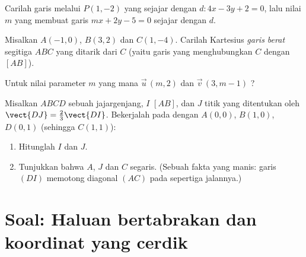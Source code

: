 \begin{exercise}[$\star\star$]\label{exo:g11:vect:8}
Carilah  garis melalui $P(1, -2)$ yang sejajar dengan
$d: 4x - 3y + 2 = 0$, lalu nilai $m$ yang membuat garis
$mx + 2y - 5 = 0$ sejajar dengan $d$.
\end{exercise}

\begin{exercise}[$\star\star$]\label{exo:g11:vect:9}
Misalkan $A(-1, 0)$, $B(3, 2)$ dan $C(1, -4)$. Carilah  Kartesius
\emph{garis berat} segitiga $ABC$ yang ditarik dari $C$ (yaitu garis yang
menghubungkan $C$ dengan  $[AB]$).
\end{exercise}

\begin{exercise}[$\star\star$]\label{exo:g11:vect:10}
Untuk nilai parameter $m$ yang mana 
$\vec u\,(m, 2)$ dan $\vec v\,(3, m - 1)$ ?
\end{exercise}

\begin{exercise}[$\star\star\star$]\label{exo:g11:vect:11}
Misalkan $ABCD$ sebuah jajargenjang, $I$  $[AB]$, dan $J$
titik yang ditentukan oleh $\vect{DJ} = \frac23 \vect{DI}$. Bekerjalah pada
 dengan $A(0,0)$, $B(1,0)$, $D(0,1)$ (sehingga $C(1,1)$):
\begin{enumerate}
  \item Hitunglah  $I$ dan $J$.
  \item Tunjukkan bahwa $A$, $J$ dan $C$ segaris. (Sebuah fakta yang manis:
        garis $(DI)$ memotong diagonal $(AC)$ pada sepertiga jalannya.)
\end{enumerate}
\end{exercise}

\section{Soal: Haluan bertabrakan dan koordinat yang cerdik}

